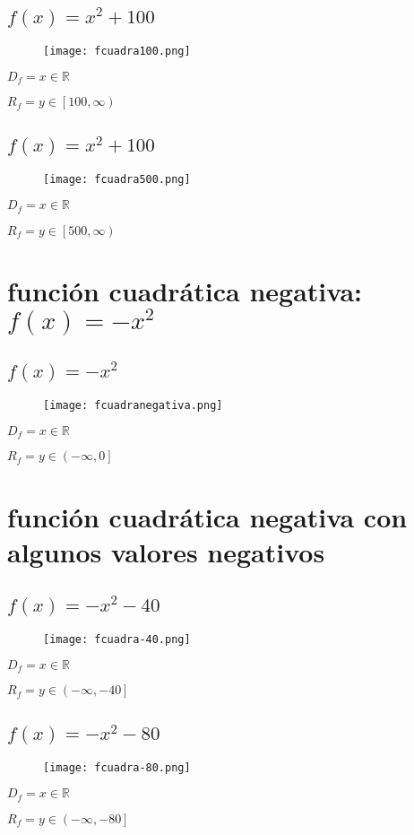 \documentclass[12pt]{article}
\begin{document}
\subsection{$f(x) = x^2 + 100$}
\begin{figure}[htb] \centering \texttt{[image: fcuadra100.png]} \end{figure}
$D_f = x \in \mathbb{R}$ \par
$R_f = y \in \left[100,\infty\right)$

\subsection{$f(x) = x^2 + 100$}
\begin{figure}[htb] \centering \texttt{[image: fcuadra500.png]} \end{figure}
$D_f = x \in \mathbb{R}$ \par
$R_f = y \in \left[500,\infty\right)$
\newpage
\section{función {\cyan cuadrática negativa}: $f(x)= -x^2$}
\subsection{$f(x) = -x^2$}
\begin{figure}[htb] \centering \texttt{[image: fcuadranegativa.png]} 
\end{figure}
$D_f = x \in \mathbb{R}$ \par
$R_f = y \in \left(-\infty,0\right]$
\section{función {\cyan cuadrática negativa} con algunos {\cyan valores negativos}}
\subsection{$f(x) = -x^2 - 40$}
\begin{figure}[htb] \centering \texttt{[image: fcuadra-40.png]} 
\end{figure}
$D_f = x \in \mathbb{R}$ \par
$R_f = y \in \left(-\infty,-40\right]$
\newpage
\subsection{$f(x) = -x^2 - 80$}
\begin{figure}[htb] \centering \texttt{[image: fcuadra-80.png]} 
\end{figure}
$D_f = x \in \mathbb{R}$ \par
$R_f = y \in \left(-\infty,-80\right]$
\end{document}
